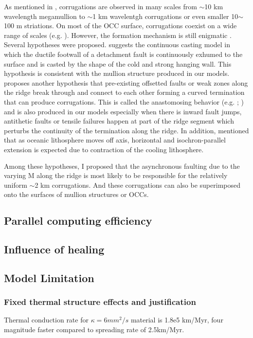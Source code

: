 As mentioned in \citep{Smith2014}, corrugations are observed in many scales from $\sim$10 km wavelength megamullion to $\sim$1 km wavelentgh corrugations or even smaller 10$\sim$100 m striations. On most of the OCC surface, corrugations coexist on a wide range of scales (e.g. \citealp{MacLeod2009}). However, the formation mechanism is still enigmatic \citep{Smith2006}. Several hypotheses were proposed. \citet{Spencer1999} suggests the continuous casting model in which the ductile footwall of a detachment fault is continuously exhumed to the surface and is casted by the shape of the cold and strong hanging wall. This hypothesis is consistent with the mullion structure produced in our models. \citet{Smith2014} proposes another hypothesis that pre-existing offsetted faults or weak zones along the ridge break through and connect to each other forming a curved termination that can produce corrugations. This is called the anastomosing behavior (e.g. \citealp{Ferrill1999}; \citealp{Wong2008}) and is also produced in our models especially when there is inward fault jumps, antithetic faults or tensile failures happen at part of the ridge segment which perturbs the continuity of the termination along the ridge. In addition, \citet{Tucholke1998} mentioned that %
as oceanic lithosphere moves off axis, horizontal and isochron-parallel extension is expected due to contraction of the cooling lithosphere.

Among these hypotheses, I proposed that the asynchronous faulting due to the varying M along the ridge is most likely to be responsible for the relatively uniform $\sim$2 km corrugations. And these corrugations can also be superimposed onto the surfaces of mullion structures or OCCs.

\iffalse
\subsection{Parallel computing efficiency}
\subsection{Influence of healing}
\subsection{Model Limitation}
\subsubsection{Fixed thermal structure effects and justification}
Thermal conduction rate for $\kappa=6mm^{2}/s$ material is 1.8e5 km/Myr, four magnitude faster compared to spreading rate of 2.5km/Myr.
